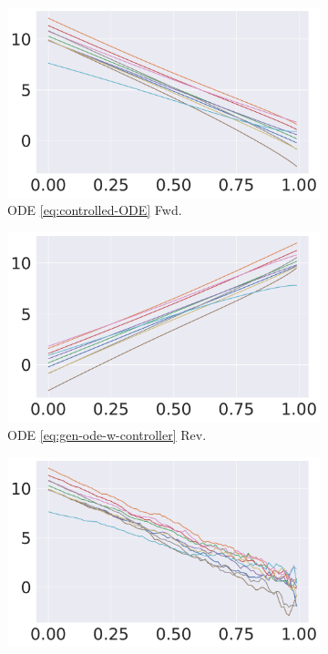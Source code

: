 \documentclass{article} %
\theoremstyle{plain}
\begin{document}
\begin{figure}[!tbh]
     \centering
     \begin{subfigure}[b]{0.24\columnwidth}
         \centering
         \includegraphics[width=\linewidth]{pics/crf-fwd.pdf}
        \caption{ODE \eqref{eq:controlled-ODE} Fwd.}
     \end{subfigure}
     \begin{subfigure}[b]{0.24\columnwidth}
         \centering
         \includegraphics[width=\linewidth]{pics/crf-inv-w-cntrl.pdf}
        \caption{ODE \eqref{eq:gen-ode-w-controller} Rev.}
     \end{subfigure}
     \begin{subfigure}[b]{0.24\columnwidth}
         \centering
         \includegraphics[width=\linewidth]{pics/crf-sde-fwd.pdf}

\end{subfigure}
\end{figure}
\end{document}
